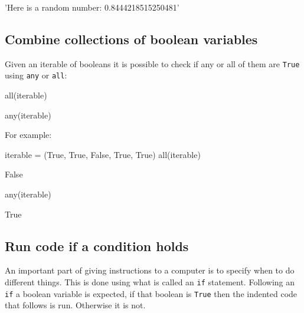 \begin{raw}
'Here is a random number: 0.8444218515250481'
\end{raw}

\subsection{Combine collections of boolean variables}
\label{\detokenize{building-tools/01-variables-conditionals-loops/how/main:how-to-combine-collections-of-boolean-of-variables}}

Given an iterable of booleans it is possible to check if any or all of them are
\texttt{True} using \texttt{any} or \texttt{all}:


\begin{pyin}
all(iterable)
\end{pyin}



\begin{pyin}
any(iterable)
\end{pyin}



For example:




\begin{pyin}
iterable = (True, True, False, True, True)
all(iterable)
\end{pyin}





\begin{raw}
False
\end{raw}







\begin{pyin}
any(iterable)
\end{pyin}





\begin{raw}
True
\end{raw}





\subsection{Run code \textbf{if} a condition holds}

An important part of giving instructions to a computer is to specify when to do
different things.
This is done using what is called an \texttt{if} statement. Following an \texttt{if} a boolean
variable is expected, if that boolean is \texttt{True} then the indented code that
follows is run. Otherwise it is not.


